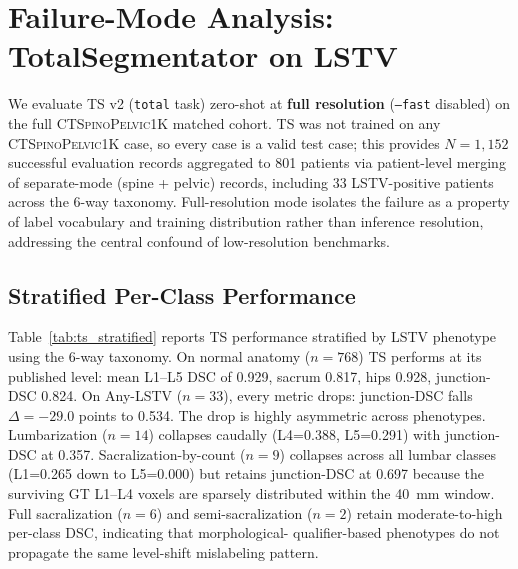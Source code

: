\documentclass{article}
\newcommand{\dataset}{\textsc{CTSpinoPelvic1K}}
\newcommand{\TS}{TotalSegmentator}
\begin{document}
\section{Failure-Mode Analysis: \TS{} on LSTV}
\label{sec:ts_failure}

We evaluate TS v2 (\texttt{total} task) zero-shot at
\textbf{full resolution} (\texttt{--fast} disabled) on the full
\dataset{} matched cohort.
TS was not trained on any \dataset{} case, so every case is a
valid test case; this provides $N=1{,}152$ successful evaluation
records aggregated to 801 patients via patient-level merging of
separate-mode (spine + pelvic) records, including 33 LSTV-positive
patients across the 6-way taxonomy.
Full-resolution mode isolates the failure as a property of label
vocabulary and training distribution rather than inference
resolution, addressing the central confound of low-resolution
benchmarks.

\subsection{Stratified Per-Class Performance}

Table~\ref{tab:ts_stratified} reports TS performance stratified by
LSTV phenotype using the 6-way taxonomy.
On normal anatomy ($n=768$) TS performs at its published level:
mean L1--L5 DSC of 0.929, sacrum 0.817, hips 0.928, junction-DSC
0.824.
On Any-LSTV ($n=33$), every metric drops:
junction-DSC falls $\Delta = -29.0$ points to 0.534.
The drop is highly asymmetric across phenotypes.
Lumbarization ($n=14$) collapses caudally (L4=0.388, L5=0.291)
with junction-DSC at 0.357.
Sacralization-by-count ($n=9$) collapses across all lumbar classes
(L1=0.265 down to L5=0.000) but retains junction-DSC at 0.697
because the surviving GT L1--L4 voxels are sparsely distributed
within the 40~mm window.
Full sacralization ($n=6$) and semi-sacralization ($n=2$) retain
moderate-to-high per-class DSC, indicating that morphological-
qualifier-based phenotypes do not propagate the same level-shift
mislabeling pattern.
\end{document}
